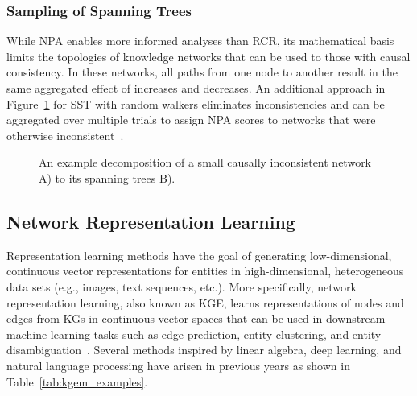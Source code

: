 \subsubsection{Sampling of Spanning Trees}

While \ac{NPA} enables more informed analyses than \ac{RCR}, its mathematical basis limits the topologies of knowledge networks that can be used to those with causal consistency.
In these networks, all paths from one node to another result in the same aggregated effect of increases and decreases.
An additional approach in Figure~\ref{fig:sst_schematic} for \ac{SST} with random walkers eliminates inconsistencies and can be aggregated over multiple trials to assign \ac{NPA} scores to networks that were otherwise inconsistent~\cite{Vasilyev2014}.

\begin{figure}
\captionsetup{format=plain}
\caption[Decomposition of Spanning Trees]{An example decomposition of a small causally inconsistent network A) to its spanning trees B)\cite{Vasilyev2014}.}
\label{fig:sst_schematic}
\end{figure}

\subsection{Network Representation Learning}
\label{subsec:nrl}

Representation learning methods have the goal of generating low-dimensional, continuous vector representations for entities in high-dimensional, heterogeneous data sets (e.g., images, text sequences, etc.).
More specifically, network representation learning, also known as \ac{KGE}, learns representations of nodes and edges from \ac{KG}s in continuous vector spaces that can be used in downstream machine learning tasks such as edge prediction, entity clustering, and entity disambiguation~\cite{Wang2017}.
Several methods inspired by linear algebra, deep learning, and natural language processing have arisen in previous years as shown in Table~\ref{tab:kgem_examples}.

